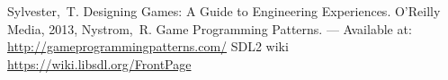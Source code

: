 \renewcommand{\bibname}{Список используемой литературы}
\begin{thebibliography}{10}
     Sylvester,~T. Designing Games: A Guide to Engineering Experiences. O'Reilly Media, 2013, 
     Nystrom,~R. Game Programming Patterns. --- Available at: 
        \url{http://gameprogrammingpatterns.com/}
     SDL2 wiki \url{https://wiki.libsdl.org/FrontPage}
\end{thebibliography}